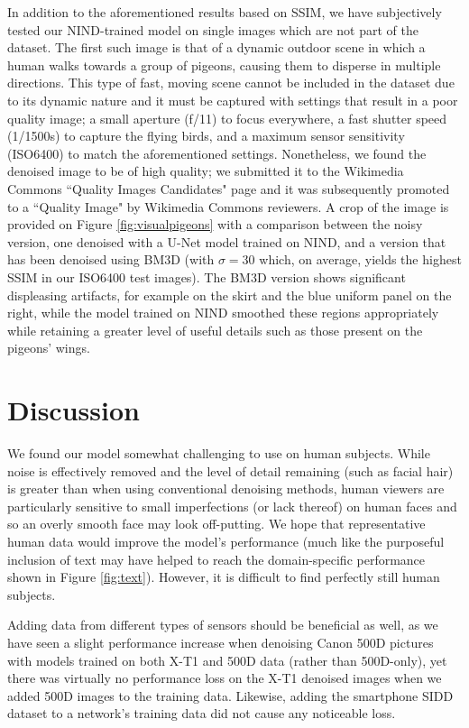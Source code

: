 \documentclass[10pt,twocolumn,letterpaper]{article}
\begin{document}
In addition to the aforementioned results based on SSIM, we have subjectively tested our NIND-trained model on single images which are not part of the dataset. The first such image is that of a dynamic outdoor scene in which a human walks towards a group of pigeons, causing them to disperse in multiple directions. This type of fast, moving scene cannot be included in the dataset due to its dynamic nature and it must be captured with settings that result in a poor quality image; a small aperture (f/11) to focus everywhere, a fast shutter speed (1/1500s) to capture the flying birds, and a maximum sensor sensitivity (ISO6400) to match the aforementioned settings. Nonetheless, we found the denoised image to be of high quality; we submitted it to the Wikimedia Commons ``Quality Images Candidates" page \cite{qic} and it was subsequently promoted to a ``Quality Image" by Wikimedia Commons reviewers. A crop of the image is provided on Figure \ref{fig:visualpigeons} with a comparison between the noisy version, one denoised with a U-Net model trained on NIND, and a version that has been denoised using BM3D (with $\sigma=30$ which, on average, yields the highest SSIM in our ISO6400 test images). The BM3D version shows significant displeasing artifacts, for example on the skirt and the blue uniform panel on the right, while the model trained on NIND smoothed these regions appropriately while retaining a greater level of useful details such as those present on the pigeons' wings.

\section{Discussion}

We found our model somewhat challenging to use on human subjects. While noise is effectively removed and the level of detail remaining (such as facial hair) is greater than when using conventional denoising methods, human viewers are particularly sensitive to small imperfections (or lack thereof) on human faces and so an overly smooth face may look off-putting. We hope that representative human data would improve the model's performance (much like the purposeful inclusion of text may have helped to reach the domain-specific performance shown in Figure \ref{fig:text}). However, it is difficult to find perfectly still human subjects.

Adding data from different types of sensors should be beneficial as well, as we have seen a slight performance increase when denoising Canon 500D pictures with models trained on both X-T1 and 500D data (rather than 500D-only), yet there was virtually no performance loss on the X-T1 denoised images when we added 500D images to the training data. Likewise, adding the smartphone SIDD dataset \cite{sidd} to a network's training data did not cause any noticeable loss.
\end{document}
